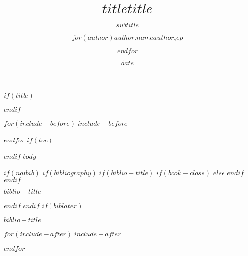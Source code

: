 \documentclass[$if(fontsize)$$fontsize$,$endif$$if(handout)$handout,$endif$$if(t)$t,$endif$$if(aspectratio)$aspectratio=$aspectratio$,$endif$]{beamer}
\title[$short_title$]{\vfill $title$}
\title{\vfill $title$}
\subtitle{$subtitle$}
\author[$short_author$]{$for(author)$$author.name$\inst{$author.inst$}$author_sep$ \and $endfor$}
\institute{$for(institute)$\inst{$institute.inst$} $institute.institute$ \and $endfor$}
\date{$date$}
\newif\ifbibliography
\begin{document}
$if(title)$
\begin{frame}
\titlepage
\end{frame}
$endif$

$for(include-before)$
$include-before$

$endfor$
$if(toc)$
\begin{frame}
\tableofcontents[hideallsubsections]
\end{frame}

$endif$
$body$

$if(natbib)$
$if(bibliography)$
$if(biblio-title)$
$if(book-class)$
\renewcommand\bibname{$biblio-title$}
$else$
\renewcommand\refname{$biblio-title$}
$endif$
$endif$
\begin{frame}[allowframebreaks]{$biblio-title$}
\bibliographytrue

\end{frame}

$endif$
$endif$
$if(biblatex)$
\begin{frame}[allowframebreaks]{$biblio-title$}
\bibliographytrue
\printbibliography[heading=none]
\end{frame}

$for(include-after)$
$include-after$

$endfor$
\end{document}

